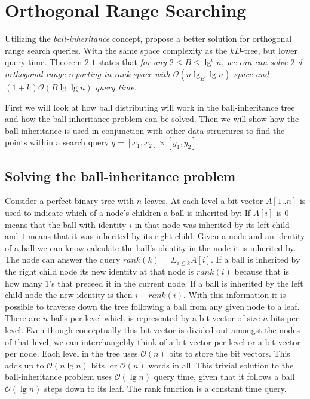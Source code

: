 \section{Orthogonal Range Searching}
\label{sect:original}
Utilizing the \emph{ball-inheritance} concept, \citeauthor{chanetal} propose a better solution for orthogonal range search queries. With the same space complexity as the $kD$-tree, but lower query time. Theorem $2.1$ states that \emph{for any $2 \leq B \leq \lg^\epsilon n$, we can can solve $2$-d orthogonal range reporting in rank space with $\mathcal{O}(n \lg_B \lg n)$ space and $(1+k)\mathcal{O}(B \lg \lg n)$ query time.}

First we will look at how ball distributing will work in the ball-inheritance tree and how the ball-inheritance problem can be solved. Then we will show how the ball-inheritance is used in conjunction with other data structures to find the points within a search query $q = [x_1, x_2] \times [y_1, y_2]$.

\subsection{Solving the ball-inheritance problem} 
\label{ssection:solving-ball}

Consider a perfect binary tree with $n$ leaves. At each level a bit vector $A[1..n]$ is used to indicate which of a node's children a ball is inherited by: If $A[i]$ is $0$ means that the ball with identity $i$ in that node was inherited by its left child and $1$ means that it was inherited by its right child. Given a node and an identity of a ball we can know calculate the ball's identity in the node it is inherited by. The node can answer the query $rank(k) = \Sigma_{i \leq k} A[i]$. If a ball is inherited by the right child node its new identity at that node is $rank(i)$ because that is how many $1$'s that preceed it in the current node. If a ball is inherited by the left child node the new identity is then $i-rank(i)$. With this information it is possible to traverse down the tree following a ball from any given node to a leaf. There are $n$ balls per level which is represented by a bit vector of size $n$ bits per level. Even though conceptually this bit vector is divided out amongst the nodes of that level, we can interchangebly think of a bit vector per level or a bit vector per node. Each level in the tree uses $\mathcal{O}(n)$ bits to store the bit vectors. This adds up to $\mathcal{O}(n \lg n)$ bits, or $\mathcal{O}(n)$ words in all. This trivial solution to the ball-inheritance problem uses $\mathcal{O}(\lg n)$ query time, given that it follows a ball $\mathcal{O}(\lg n)$ steps down to its leaf. The rank function is a constant time query. \\


